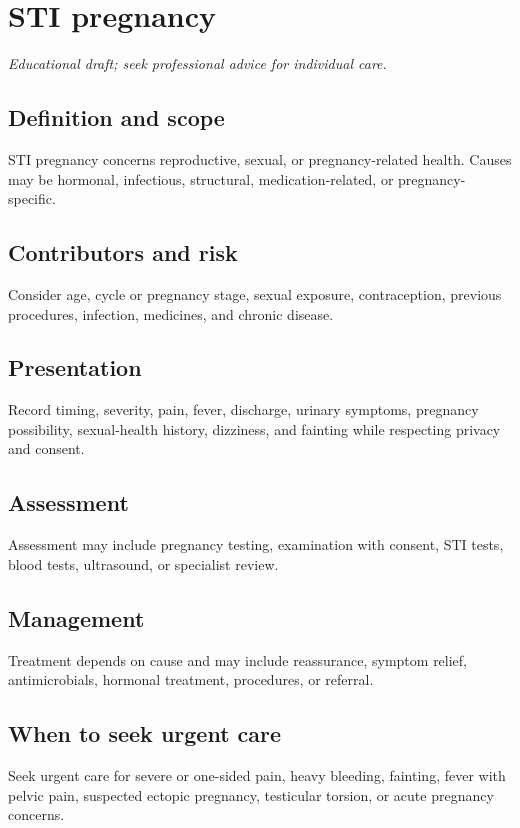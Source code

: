 \chapter{STI pregnancy}
\medskip
\noindent\textit{Educational draft; seek professional advice for individual care.}

\section*{Definition and scope}
STI pregnancy concerns reproductive, sexual, or pregnancy-related health. Causes may be hormonal, infectious, structural, medication-related, or pregnancy-specific.

\section*{Contributors and risk}
Consider age, cycle or pregnancy stage, sexual exposure, contraception, previous procedures, infection, medicines, and chronic disease.

\section*{Presentation}
Record timing, severity, pain, fever, discharge, urinary symptoms, pregnancy possibility, sexual-health history, dizziness, and fainting while respecting privacy and consent.

\section*{Assessment}
Assessment may include pregnancy testing, examination with consent, STI tests, blood tests, ultrasound, or specialist review.

\section*{Management}
Treatment depends on cause and may include reassurance, symptom relief, antimicrobials, hormonal treatment, procedures, or referral.

\section*{When to seek urgent care}
Seek urgent care for severe or one-sided pain, heavy bleeding, fainting, fever with pelvic pain, suspected ectopic pregnancy, testicular torsion, or acute pregnancy concerns.

